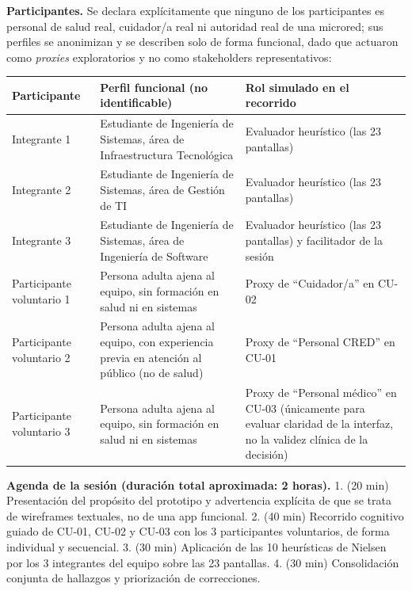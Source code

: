 \documentclass[11pt,a4paper]{article}
\begin{document}
\textbf{Participantes.} Se declara explícitamente que ninguno de los participantes es personal de salud real, cuidador/a real ni autoridad real de una microred; sus perfiles se anonimizan y se describen solo de forma funcional, dado que actuaron como \emph{proxies} exploratorios y no como stakeholders representativos:

{\small
\begin{longtable}[]{@{}
  >{\raggedright\arraybackslash}p{}
  >{\raggedright\arraybackslash}p{}
  >{\raggedright\arraybackslash}p{}@{}}
\toprule\noalign{}
\begin{minipage}[b]{\linewidth}\raggedright
Participante
\end{minipage} & \begin{minipage}[b]{\linewidth}\raggedright
Perfil funcional (no identificable)
\end{minipage} & \begin{minipage}[b]{\linewidth}\raggedright
Rol simulado en el recorrido
\end{minipage} \\
\midrule\noalign{}
\endhead
\bottomrule\noalign{}
\endlastfoot
Integrante 1 & Estudiante de Ingeniería de Sistemas, área de Infraestructura Tecnológica & Evaluador heurístico (las 23 pantallas) \\
Integrante 2 & Estudiante de Ingeniería de Sistemas, área de Gestión de TI & Evaluador heurístico (las 23 pantallas) \\
Integrante 3 & Estudiante de Ingeniería de Sistemas, área de Ingeniería de Software & Evaluador heurístico (las 23 pantallas) y facilitador de la sesión \\
Participante voluntario 1 & Persona adulta ajena al equipo, sin formación en salud ni en sistemas & Proxy de ``Cuidador/a'' en CU-02 \\
Participante voluntario 2 & Persona adulta ajena al equipo, con experiencia previa en atención al público (no de salud) & Proxy de ``Personal CRED'' en CU-01 \\
Participante voluntario 3 & Persona adulta ajena al equipo, sin formación en salud ni en sistemas & Proxy de ``Personal médico'' en CU-03 (únicamente para evaluar claridad de la interfaz, no la validez clínica de la decisión) \\
\end{longtable}
}

\textbf{Agenda de la sesión (duración total aproximada: 2 horas).}
1. (20 min) Presentación del propósito del prototipo y advertencia explícita de que se trata de wireframes textuales, no de una app funcional.
2. (40 min) Recorrido cognitivo guiado de CU-01, CU-02 y CU-03 con los 3 participantes voluntarios, de forma individual y secuencial.
3. (30 min) Aplicación de las 10 heurísticas de Nielsen por los 3 integrantes del equipo sobre las 23 pantallas.
4. (30 min) Consolidación conjunta de hallazgos y priorización de correcciones.
\end{document}
